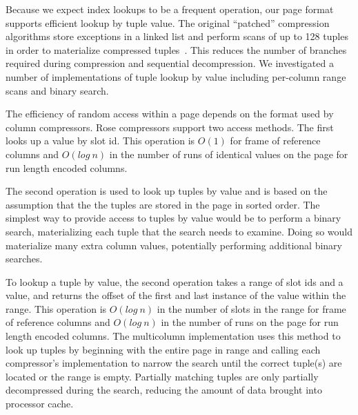 \documentclass{vldb}
\newcommand{\rows}{Rose\xspace}
\begin{document}
Because we expect index lookups to be a frequent operation, our
page format supports efficient lookup by tuple value.  The original
``patched'' compression algorithms store exceptions in a linked list
and perform scans of up to 128 tuples in order to materialize compressed
tuples~\cite{pfor}.  This reduces the number of branches
required during compression and sequential decompression.  We
investigated a number of implementations of tuple lookup by value
including per-column range scans and binary search.

The efficiency of random access within a
page depends on the format used by column compressors.  \rows
compressors support two access methods.  The first looks up a value by
slot id.  This operation is $O(1)$ for frame of reference columns and
$O(log~n)$ in the number of runs of identical values on the page for
run length encoded columns.

The second operation is used to look up tuples by value and is based
on the assumption that the the tuples are stored in the
page in sorted order.  The simplest way to provide access to tuples by
value would be to perform a binary search, materializing each tuple
that the search needs to examine.  Doing so would materialize many
extra column values, potentially performing additional binary searches.

To lookup a tuple by value, the second operation takes a range of slot
ids and a value, and returns the offset of the first and last instance
of the value within the range.  This operation is $O(log~n)$ in the
number of slots in the range for frame of reference columns and
$O(log~n)$ in the number of runs on the page for run length encoded
columns.  The multicolumn implementation uses this method to look up
tuples by beginning with the entire page in range and calling each
compressor's implementation to narrow the search until the
correct tuple(s) are located or the range is empty.
Partially matching tuples are only partially decompressed during the
search, reducing the amount of data brought into processor cache.
\end{document}
